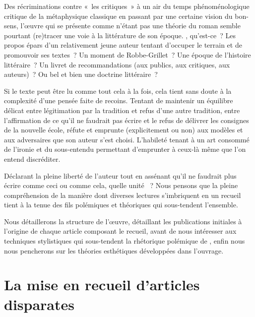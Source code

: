 \documentclass[12pt, a4paper]{article}
\begin{document}
Des récriminations contre «~les critiques~» à un air du temps phénoménologique critique de la métaphysique classique en passant par une certaine vision du bon-sens, l'œuvre qui se présente comme n'étant pas une théorie du roman semble pourtant (re)tracer une voie à la littérature de son époque. \punr, qu'est-ce~? Les propos épars d'un relativement jeune auteur tentant d'occuper le terrain et de promouvoir ses textes~? Un moment de Robbe-Grillet~? Une époque de l'histoire littéraire~? Un livret de recommandations (aux publics, aux critiques, aux auteurs)~? Ou bel et bien une doctrine littéraire~?

Si le texte peut être lu comme tout cela à la fois, cela tient sans doute à la complexité d'une pensée faite de recoins. Tentant de maintenir un équilibre délicat entre légitimation par la tradition et refus d'une autre tradition, entre l'affirmation de ce qu'il ne faudrait pas écrire et le refus de délivrer les consignes de la nouvelle école, \punr{} réfute et emprunte (explicitement ou non) aux modèles et aux adversaires que son auteur s'est choisi. L'habileté tenant à un art consommé de l'ironie et du sous-entendu permettant d'emprunter à ceux-là même que l'on entend discréditer.

Déclarant la pleine liberté de l'auteur tout en assénant qu'il ne faudrait plus écrire comme ceci ou comme cela, quelle unité \punr~? Nous pensons que la pleine compréhension de la manière dont diverses lectures s'imbriquent en un recueil tient à la tenue des fils polémiques et théoriques qui sous-tendent l'ensemble. 

Nous détaillerons la structure de l'œuvre, détaillant les publications initiales à l'origine de chaque article composant le recueil, avant de nous intéresser aux techniques stylistiques qui sous-tendent la rhétorique polémique de \robbe, enfin nous nous pencherons sur les théories esthétiques développées dans l'ouvrage.

\newpage

\section{La mise en recueil d'articles disparates}


\end{document}
